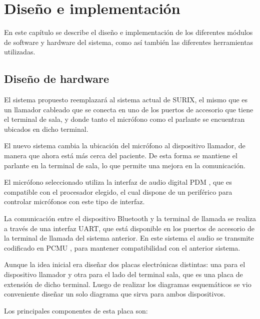 	\chapter{Diseño e implementación} %

\label{Chapter3}

En este capítulo se describe el diseño e implementación de los diferentes módulos de software y hardware del sistema, como así también las diferentes herramientas utilizadas.




\section{Diseño de hardware}

El sistema propuesto reemplazará al sistema actual de SURIX, el mismo que es un llamador cableado que se conecta en uno de los puertos de accesorio que tiene el terminal de sala, y donde tanto el micrófono como el parlante se encuentran ubicados en dicho terminal.

El nuevo sistema cambia la ubicación del micrófono al dispositivo llamador, de manera que ahora está más cerca del paciente. De esta forma se mantiene el parlante en la terminal de sala, lo que permite una mejora en la comunicación.

El micrófono seleccionado utiliza la interfaz de audio digital PDM \cite{PDM}, que es compatible con el procesador elegido, el cual dispone de un periférico para controlar micrófonos con este tipo de interfaz.

La comunicación entre el dispositivo Bluetooth y la terminal de llamada se realiza a  través de una interfaz UART, que está disponible en los puertos de accesorio de la terminal de llamada del sistema anterior. En este sistema el audio se transmite codificado en PCMU \cite{PCMU}, para mantener compatibilidad con el anterior sistema.

Aunque la idea inicial era diseñar dos placas electrónicas distintas: una para el dispositivo llamador y otra para el lado del terminal sala, que es una placa de extensión de dicho terminal. Luego de realizar los diagramas esquemáticos se vio conveniente diseñar un solo diagrama que sirva para ambos dispositivos. 

Los principales componentes de esta placa son:

